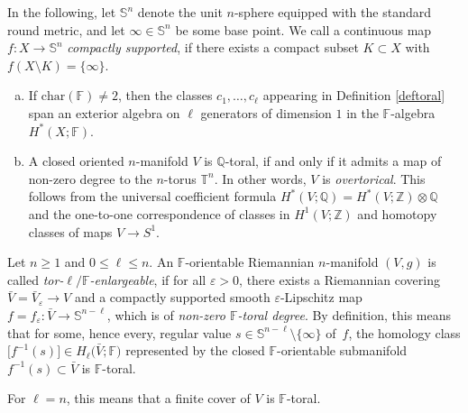 \documentclass[10pt,a4paper]{amsart}
\numberwithin{equation}{section}
\newcommand{\F}{\mathbb{F}}
\newcommand{\SSS}{\mathbb{S}}
\newcommand{\TTT}{\mathbb{T}}
\newcommand{\charac}{\mathrm{char}}
\begin{document}
In the following, let $\SSS^n$ denote the unit $n$-sphere equipped with the standard round metric, and let $\infty \in \SSS^n$ be some base point.
We call a continuous map $f \colon X \to \SSS^n$ {\em compactly supported}, if there exists a compact subset $K \subset X$ with $f(X \setminus K) = \{ \infty\}$.

\begin{Remark} \label{rem:bemerkung}\quad
\begin{enumerate}[(a)]\itemsep=0pt
\item If $\charac(\F) \neq 2$, then the classes $c_1, \ldots, c_\ell$ appearing in Definition \ref{deftoral} span an exterior algebra on $\ell$ generators of dimension $1$ in the $\F$-algebra $H^*(X ; \F)$.
\item \label{overtorical} A closed oriented $n$-manifold $V$ is $\mathbb{Q}$-toral, if and only if it admits a map of non-zero degree to the $n$-torus $\TTT^n$.
In other words, $V$ is {\em overtorical}.
This follows from the universal coefficient formula $H^*(V; \mathbb{Q}) = H^*(V; \mathbb{Z}) \otimes \mathbb{Q}$ and the one-to-one correspondence of classes in $H^1(V; \mathbb{Z})$ and homotopy classes of maps $V \to S^1$.
\end{enumerate}
\end{Remark}


\begin{Definition} \label{def:enlargeable} Let $n \geq 1$ and $0 \leq \ell \leq n$.
An $\F$-orientable Riemannian $n$-manifold $(V,g)$ is called {\it tor-$\ell/\mathbb F$-enlargeable}, if for all $\varepsilon > 0$, there exists a Riemannian covering
$
 \bar V = \bar V_\varepsilon \to V
$
and a compactly supported smooth $\varepsilon$-Lipschitz map
$
 f = f_\varepsilon \colon \bar V \to \SSS^{n-\ell}
$,
which is of {\em non-zero $\F$-toral degree}.
By definition, this means that for some, hence every, regular value ${s \in \SSS^{n - \ell} \setminus \{\infty\}}$ of~$f$, the homology class $\big[f^{-1}(s)\big] \in H_{\ell}\big(\bar V; \F\big)$ represented by the closed $\F$-orientable submanifold~${f^{-1}(s) \subset \bar V}$ is $\F$-toral.

For $\ell = n$, this means that a finite cover of $V$ is $\F$-toral.
\end{Definition}
\end{document}

